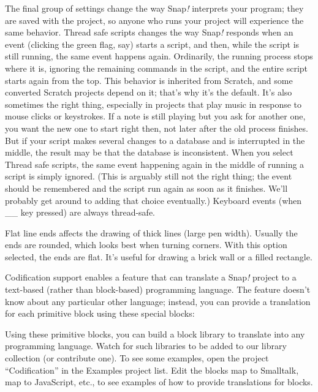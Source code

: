 The final group of settings change the way Snap\emph{!} interprets your
program; they are saved with the project, so anyone who runs your
project will experience the same behavior. Thread safe scripts changes
the way Snap\emph{!} responds when an event (clicking the green flag,
say) starts a script, and then, while the script is still running, the
same event happens again. Ordinarily, the running process stops where it
is, ignoring the remaining commands in the script, and the entire script
starts again from the top. This behavior is inherited from Scratch, and
some converted Scratch projects depend on it; that's why it's the
default. It's also sometimes the right thing, especially in projects
that play music in response to mouse clicks or keystrokes. If a note is
still playing but you ask for another one, you want the new one to start
right then, not later after the old process finishes. But if your script
makes several changes to a database and is interrupted in the middle,
the result may be that the database is inconsistent. When you select
Thread safe scripts, the same event happening again in the middle of
running a script is simply ignored. (This is arguably still not the
right thing; the event should be remembered and the script run again as
soon as it finishes. We'll probably get around to adding that choice
eventually.) Keyboard events (when \_\_ key pressed) are always
thread-safe.

Flat line ends affects the drawing of thick lines (large pen width).
Usually the ends are rounded, which looks best when turning corners.
With this option selected, the ends are flat. It's useful for drawing a
brick wall or a filled rectangle.

Codification support enables a feature that can translate a Snap\emph{!}
project to a text-based (rather than block-based) programming language.
The feature doesn't know about any particular other language; instead,
you can provide a translation for each primitive block using these
special blocks:

Using these primitive blocks, you can build a block library to translate
into any programming language. Watch for such libraries to be added to
our library collection (or contribute one). To see some examples, open
the project ``Codification'' in the Examples project list. Edit the
blocks map to Smalltalk, map to JavaScript, etc., to see examples of how
to provide translations for blocks.

